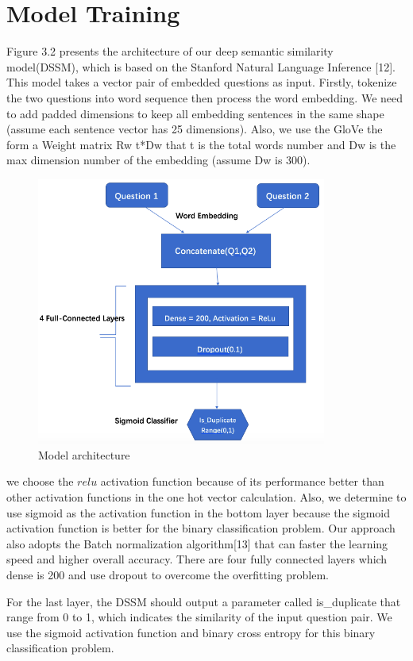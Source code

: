 	\section{Model Training}
	Figure 3.2 presents the architecture of our deep semantic similarity model(DSSM), which is based on the Stanford Natural Language Inference [12]. This model takes a vector pair of embedded questions as input. Firstly, tokenize the two questions into word sequence then process the word embedding. We need to add padded dimensions to keep all embedding sentences in the same shape (assume each sentence vector has 25 dimensions). Also, we use the GloVe the form a Weight matrix Rw t*Dw that t is the total words number and Dw is the max dimension number of the embedding (assume Dw is 300). 
	\par
	\begin{figure}[!h]
		\centering
		\includegraphics[width = 0.85\textwidth]{figures/modelac.png}
		\caption{Model architecture}
	\end{figure}
	
	we choose the $relu$ activation function because of its performance better than other activation functions in the one hot vector calculation. Also, we determine to use sigmoid as the activation function in the bottom layer because the sigmoid activation function is better for the binary classification problem. Our approach also adopts the Batch normalization algorithm[13] that can faster the learning speed and higher overall accuracy. There are four fully connected layers which dense is 200 and use dropout to overcome the overfitting problem. 
	\par
	For the last layer, the DSSM should output a parameter called is\_duplicate that range from 0 to 1, which indicates the similarity of the input question pair. We use the sigmoid activation function and binary cross entropy for this binary classification problem.
	\par
	